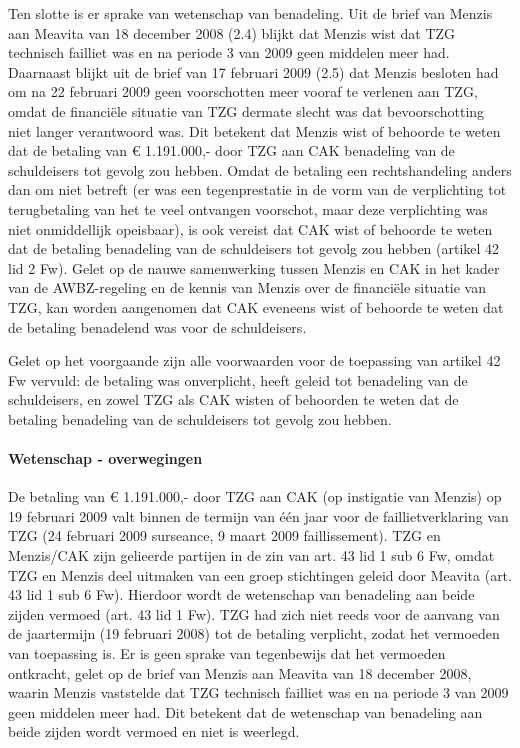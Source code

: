 \documentclass[
  dutch,
  a4paper,
]{article}
\begin{document}
Ten slotte is er sprake van wetenschap van benadeling. Uit de brief van Menzis aan Meavita van 18 december 2008 (2.4) blijkt dat Menzis wist dat TZG technisch failliet was en na periode 3 van 2009 geen middelen meer had. Daarnaast blijkt uit de brief van 17 februari 2009 (2.5) dat Menzis besloten had om na 22 februari 2009 geen voorschotten meer vooraf te verlenen aan TZG, omdat de financiële situatie van TZG dermate slecht was dat bevoorschotting niet langer verantwoord was. Dit betekent dat Menzis wist of behoorde te weten dat de betaling van € 1.191.000,- door TZG aan CAK benadeling van de schuldeisers tot gevolg zou hebben. Omdat de betaling een rechtshandeling anders dan om niet betreft (er was een tegenprestatie in de vorm van de verplichting tot terugbetaling van het te veel ontvangen voorschot, maar deze verplichting was niet onmiddellijk opeisbaar), is ook vereist dat CAK wist of behoorde te weten dat de betaling benadeling van de schuldeisers tot gevolg zou hebben (artikel 42 lid 2 Fw). Gelet op de nauwe samenwerking tussen Menzis en CAK in het kader van de AWBZ-regeling en de kennis van Menzis over de financiële situatie van TZG, kan worden aangenomen dat CAK eveneens wist of behoorde te weten dat de betaling benadelend was voor de schuldeisers.

Gelet op het voorgaande zijn alle voorwaarden voor de toepassing van artikel 42 Fw vervuld: de betaling was onverplicht, heeft geleid tot benadeling van de schuldeisers, en zowel TZG als CAK wisten of behoorden te weten dat de betaling benadeling van de schuldeisers tot gevolg zou hebben.

\paragraph{Wetenschap - overwegingen}\label{wetenschap---overwegingen-87}

De betaling van € 1.191.000,- door TZG aan CAK (op instigatie van Menzis) op 19 februari 2009 valt binnen de termijn van één jaar voor de faillietverklaring van TZG (24 februari 2009 surseance, 9 maart 2009 faillissement). TZG en Menzis/CAK zijn gelieerde partijen in de zin van art. 43 lid 1 sub 6 Fw, omdat TZG en Menzis deel uitmaken van een groep stichtingen geleid door Meavita (art. 43 lid 1 sub 6 Fw). Hierdoor wordt de wetenschap van benadeling aan beide zijden vermoed (art. 43 lid 1 Fw). TZG had zich niet reeds voor de aanvang van de jaartermijn (19 februari 2008) tot de betaling verplicht, zodat het vermoeden van toepassing is. Er is geen sprake van tegenbewijs dat het vermoeden ontkracht, gelet op de brief van Menzis aan Meavita van 18 december 2008, waarin Menzis vaststelde dat TZG technisch failliet was en na periode 3 van 2009 geen middelen meer had. Dit betekent dat de wetenschap van benadeling aan beide zijden wordt vermoed en niet is weerlegd.
\end{document}
